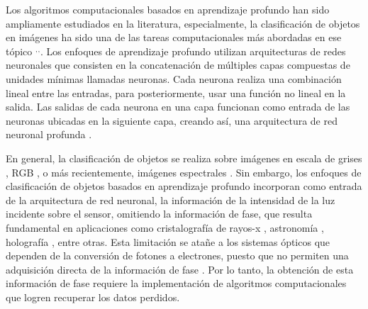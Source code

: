 


Los algoritmos computacionales basados en aprendizaje profundo han sido ampliamente estudiados en la literatura, especialmente, la clasificación de objetos en imágenes ha sido una de las tareas computacionales más abordadas en ese tópico $^,$$^,$. Los enfoques de aprendizaje profundo utilizan arquitecturas de redes neuronales que consisten en la concatenación de múltiples capas compuestas de unidades mínimas llamadas neuronas. Cada neurona realiza una combinación lineal entre las entradas, para posteriormente, usar una función no lineal en la salida. Las salidas de cada neurona en una capa funcionan como entrada de las neuronas ubicadas en la siguiente capa, creando así, una arquitectura de red neuronal profunda . 

En general, la clasificación de objetos se realiza sobre imágenes en escala de grises , RGB , o más recientemente, imágenes espectrales . Sin embargo, los enfoques de clasificación de objetos basados en aprendizaje profundo incorporan como entrada de la arquitectura de red neuronal, la información de la intensidad de la luz incidente sobre el sensor, omitiendo la información de fase, que resulta fundamental en aplicaciones como cristalografía de rayos-x , astronomía , holografía , entre otras. Esta limitación se atañe a los sistemas ópticos que dependen de la conversión de fotones a electrones, puesto que no permiten una adquisición directa de la información de fase . Por lo tanto, la obtención de esta información de fase requiere la implementación de algoritmos computacionales que logren recuperar los datos perdidos.

